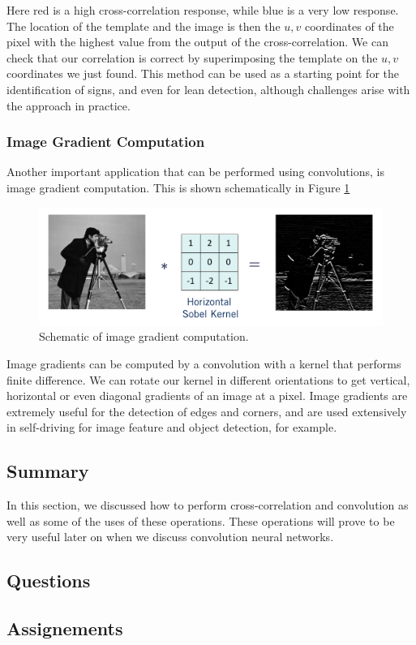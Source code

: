 Here red is a high cross-correlation response, while blue is
a very low response. The location of the template
and the image is then the $u, v$ coordinates of the pixel with the highest value from the output of
the cross-correlation. We can check that
our correlation is correct by superimposing
the template on the $u, v$ coordinates we just found. This method can be used as a starting point for
the identification of signs, and even for lean detection, although challenges arise with the approach in practice. 

\subsubsection{Image Gradient Computation}

Another important application that can be performed using convolutions, is image gradient computation. 
This is shown schematically in Figure \ref{camera_man_6}

\begin{figure}[!htb]
\begin{center}
\includegraphics[scale=0.380]{img/visual_perception/camera_man_6.jpeg}
\end{center}
\caption{Schematic of image gradient computation.}
\label{camera_man_6}
\end{figure}

Image gradients can be computed by a convolution with a kernel that performs finite difference. We can rotate our kernel in different orientations
to get vertical, horizontal or even diagonal gradients of an image at a pixel. Image gradients are
extremely useful for the detection of edges and corners, and are used extensively
in self-driving for image feature and object detection, for example. 

\subsection{Summary}

In this section, we discussed how to perform cross-correlation and convolution as well as some of the uses
of these operations. These operations will prove to be very useful later on when we discuss
convolution neural networks. 

\subsection{Questions}

\subsection{Assignements}

